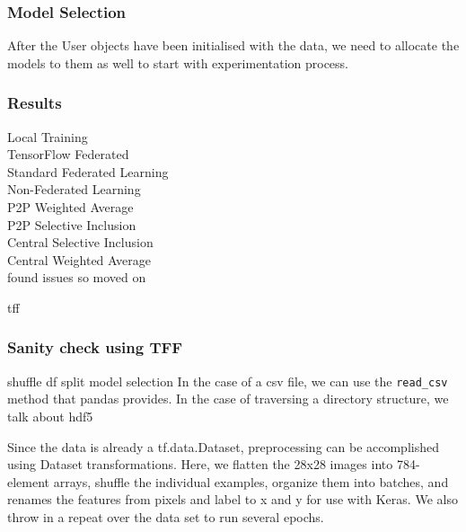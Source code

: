 \documentclass[12pt]{article}
\newcommand{\forcond}[2]{#1 \KwTo #2}
\begin{document}
%	    
\subsubsection{Model Selection}
After the User objects have been initialised with the data, we need to allocate the models to them as well to start with experimentation process.
\subsubsection{Results}
Local Training\\
TensorFlow Federated\\
Standard Federated Learning\\
Non-Federated Learning\\
P2P Weighted Average\\
P2P Selective Inclusion\\
Central Selective Inclusion\\
Central Weighted Average\\
found issues so moved on

tff 

\subsubsection{Sanity check using TFF}
shuffle
df split
model selection
In the case of a csv file, we can use the \texttt{read\_csv} method that pandas provides. In the case of traversing a directory structure, we 
talk about hdf5

Since the data is already a tf.data.Dataset, preprocessing can be accomplished using Dataset transformations. Here, we flatten the 28x28 images into 784-element arrays, shuffle the individual examples, organize them into batches, and renames the features from pixels and label to x and y for use with Keras. We also throw in a repeat over the data set to run several epochs.
\end{document}
